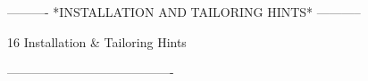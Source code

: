  
 
 
 
 
 
 
 
 
 
 
 
 
 
 
 
 
 
 
 
 
 
 
 
 
 
 
 
 
 
 
 
 
 
 
 
 
 
 
 
 
 
 
 
 
 
 
 
 
 
 
 
 
 
 
----------  *INSTALLATION AND TAILORING HINTS*  -----------
 
16
Installation & Tailoring Hints
 
----------------------------------------
 
 
 
 
 
 
 
 
 
 
 
 
 
 
 
 
 
 
 
 
 
 
 
 
 
 
 
 
 
 
 
 
 
 
 
 
 
 
 
 
 
 
 
 
 
 
 
 
 
 
 
 
 
 
 
